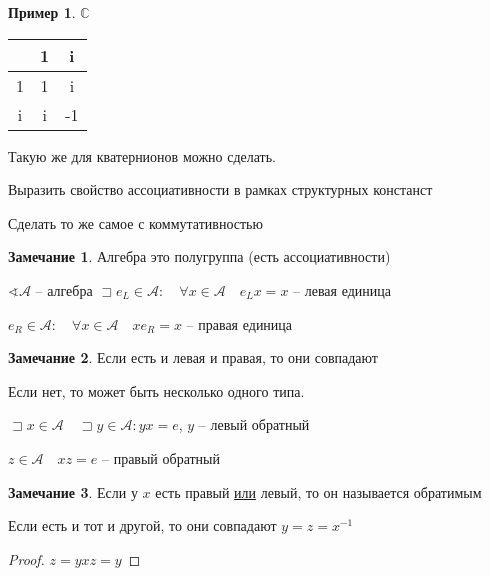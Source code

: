 \documentclass{book}
\renewcommand\C{\ensuremath{\mathbb{C}}}
\theoremstyle{definition}
\newtheorem*{note}{Замечание}
\newtheorem*{example}{Пример}
\begin{document}
\begin{example}
    $\C$

    \begin{tabular}{|c|c|c|}       
    \hline &1&i\\ \hline
    1 & 1 & i\\ \hline
i&i&-1\\ \hline
    \end{tabular}

    Такую же для кватернионов можно сделать. 
\end{example}

\begin{problem}
    Выразить свойство ассоциативности в рамках структурных констанст

    Сделать то же самое с коммутативностью
\end{problem}

\begin{note}
    Алгебра это полугруппа (есть ассоциативности)
\end{note}

$\sphericalangle \mathscr{A}$ -- алгебра $\sqsupset e_L\in \mathscr{A}:\quad \forall x\in \mathscr{A}\quad e_L x = x$ -- левая единица

$e_R\in\mathscr{A}:\quad \forall x\in \mathscr{A}\quad xe_R = x$ -- правая единица

\begin{note}
    Если есть и левая и правая, то они совпадают

    Если нет, то может быть несколько одного типа.
\end{note}

$\sqsupset x\in \mathscr{A}\quad \sqsupset y\in \mathscr{A}: yx = e$, $y$ -- левый обратный

$z\in\mathscr{A}\quad xz = e$ -- правый обратный

 \begin{note}
     Если у $x$ есть правый \underline{или} левый, то он называется обратимым

     Если есть и тот и другой, то они совпадают $y = z = x^{-1}$
      \begin{proof}
         $z = yxz = y$
     \end{proof}
\end{note}










    
\end{document}
